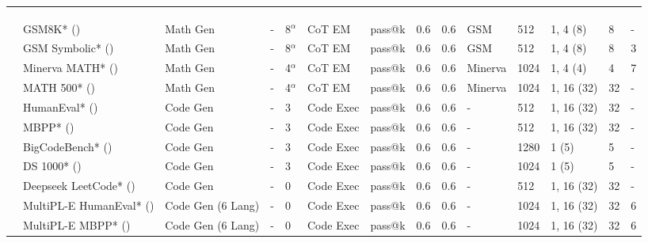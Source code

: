 \documentclass[table]{ai2style/ai2}
\begin{document}
{{\begin{table}[t]
\begin{scriptsize}
{\begin{tabular}{llHHlllllHllHl}
 \\[-9pt]
 \\
 \\[-9pt]
 & GSM8K* (\citeyear{cobbe2021gsm8k}) & Math Gen & - & 8$^\alpha$ & CoT EM & pass@k & 0.6 & 0.6 & GSM & 512 & 1, 4 (8) & 8 & - \\
 & GSM Symbolic* (\citeyear{gsm-symbolic}) & Math Gen & - & 8$^\alpha$ & CoT EM & pass@k & 0.6 & 0.6 & GSM & 512 & 1, 4 (8) & 8 & 3 \\
 & Minerva MATH* (\citeyear{lewkowycz2022solving}) & Math Gen & - & 4$^\alpha$ & CoT EM & pass@k & 0.6 & 0.6 & Minerva & 1024 & 1, 4 (4) & 4 & 7 \\
  & MATH 500* (\citeyear{lewkowycz2022solving,lightman2023lets}) & Math Gen & - & 4$^\alpha$ & CoT EM & pass@k & 0.6 & 0.6 & Minerva & 1024 & 1, 16 (32) & 32 & - \\
 & HumanEval* (\citeyear{chen2021codex}) & Code Gen & - & 3 & Code Exec & pass@k & 0.6 & 0.6 & - & 512 & 1, 16 (32) & 32 & - \\
 & MBPP* (\citeyear{austin2021program}) & Code Gen & - & 3 & Code Exec & pass@k & 0.6 & 0.6 & - & 512 & 1, 16 (32) & 32 & - \\
 & BigCodeBench* (\citeyear{zhuo2024bigcodebench}) & Code Gen & - & 3 & Code Exec & pass@k & 0.6 & 0.6 & - & 1280 & 1 (5) & 5 & - \\
 & DS 1000* (\citeyear{Lai2022DS1000}) & Code Gen & - & 3 & Code Exec & pass@k & 0.6 & 0.6 & - & 1024 & 1 (5) & 5 & - \\
 & Deepseek LeetCode* (\citeyear{guo2024deepseek}) & Code Gen & - & 0 & Code Exec & pass@k & 0.6 & 0.6 & - & 512 & 1, 16 (32) & 32 & - \\
 & MultiPL-E HumanEval* (\citeyear{cassano2022multipl}) & Code Gen (6 Lang) & - & 0 & Code Exec & pass@k & 0.6 & 0.6 & - & 1024 & 1, 16 (32) & 32 & 6 \\
  & MultiPL-E MBPP* (\citeyear{cassano2022multipl}) & Code Gen (6 Lang) & - & 0 & Code Exec & pass@k & 0.6 & 0.6 & - & 1024 & 1, 16 (32) & 32 & 6 \\

\end{tabular}}
\end{scriptsize}
\end{table}}}
\end{document}
